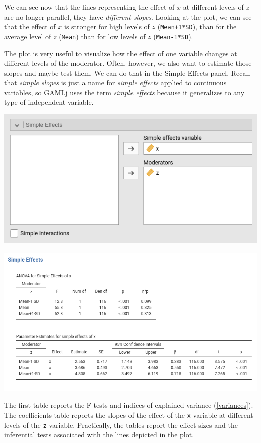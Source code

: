 \documentclass[
]{book}
\begin{document}
We can see now that the lines representing the effect of \(x\) at different levels of \(z\) are no longer parallel, they have \emph{different slopes}. Looking at the plot, we can see that the effect of \(x\) is stronger for high levels of \(z\) (\texttt{Mean+1*SD}), than for the average level of \(z\) (\texttt{Mean}) than for low levels of \(z\) (\texttt{Mean-1*SD}).

The plot is very useful to visualize how the effect of one variable changes at different levels of the moderator. Often, however, we also want to estimate those slopes and maybe test them. We can do that in the {Simple Effects} panel. Recall that \emph{simple slopes} is just a name for \emph{simple effects} applied to continuous variables, so {GAMLj} uses the term \emph{simple effects} because it generalizes to any type of independent variable.

\includegraphics[width=7.82in]{bookletpics/2_input13}

\includegraphics[width=10.24in]{bookletpics/2_output13}

The first table reports the F-tests and indices of explained variance (\ref{variances}). The coefficients table reports the slopes of the effect of the \texttt{x} variable at different levels of the \texttt{z} variable. Practically, the tables report the effect sizes and the inferential tests associated with the lines depicted in the plot.
\end{document}
